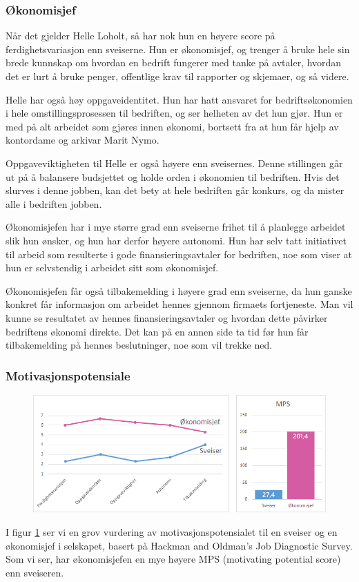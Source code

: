 \subsubsection{Økonomisjef}
Når det gjelder Helle Loholt, så har nok hun en høyere score på ferdighetsvariasjon enn sveiserne. Hun er økonomisjef, og trenger å bruke hele sin brede kunnskap om hvordan en bedrift fungerer med tanke på avtaler, hvordan det er lurt å bruke penger, offentlige krav til rapporter og skjemaer, og så videre.

Helle har også høy oppgaveidentitet. Hun har hatt ansvaret for bedriftsøkonomien i hele omstillingsprosessen til bedriften, og ser helheten av det hun gjør. Hun er med på alt arbeidet som gjøres innen økonomi, bortsett fra at hun får hjelp av kontordame og arkivar Marit Nymo.

Oppgaveviktigheten til Helle er også høyere enn sveisernes. Denne stillingen går ut på å balansere budsjettet og holde orden i økonomien til bedriften. Hvis det slurves i denne jobben, kan det bety at hele bedriften går konkurs, og da mister alle i bedriften jobben.

Økonomisjefen har i mye større grad enn sveiserne frihet til å planlegge arbeidet slik hun ønsker, og hun har derfor høyere autonomi. Hun har selv tatt initiativet til arbeid som resulterte i gode finansieringsavtaler for bedriften, noe som viser at hun er selvstendig i arbeidet sitt som økonomisjef.

Økonomisjefen får også tilbakemelding i høyere grad enn sveiserne, da hun ganske konkret får informasjon om arbeidet hennes gjennom firmaets fortjeneste. Man vil kunne se resultatet av hennes finansieringsavtaler og hvordan dette påvirker bedriftens økonomi direkte. Det kan på en annen side ta tid før hun får tilbakemelding på hennes beslutninger, noe som vil trekke ned.

\subsubsection{Motivasjonspotensiale}
\begin{figure}[ht!]
    \centering
    \includegraphics[width=135mm]{mps.png}
    \label{fig:mps}
\end{figure}
I figur \ref{fig:mps} ser vi en grov vurdering av motivasjonspotensialet til en sveiser og en økonomisjef i selskapet, basert på Hackman and Oldman’s Job Diagnostic Survey. Som vi ser, har økonomisjefen en mye høyere MPS (motivating potential score) enn sveiseren.


